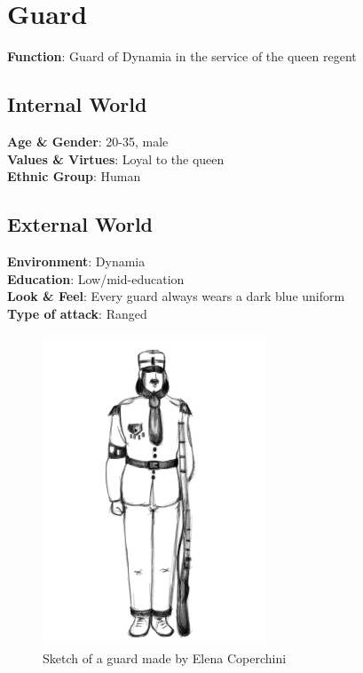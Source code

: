 {\let\clearpage\relax\section{Guard}}

\begin{minipage}{0.5\textwidth}
\textbf{Function}: Guard of Dynamia in the service of the queen regent

\subsection{Internal World}

\textbf{Age \& Gender}: 20-35, male \\
\textbf{Values \& Virtues}: Loyal to the queen\\
\textbf{Ethnic Group}: Human

\subsection{External World}
\textbf{Environment}: Dynamia \\
\textbf{Education}: Low/mid-education \\
\textbf{Look \& Feel}: Every guard always wears a dark blue uniform \\
\textbf{Type of attack}: Ranged \\
\end{minipage}%
%
\hfill\begin{minipage}{0.4\textwidth}
  \begin{figure}[H]
  \includegraphics{Images/Characters/guard_portrait}
  \caption{Sketch of a guard made by Elena Coperchini}
  \end{figure}
\end{minipage}


